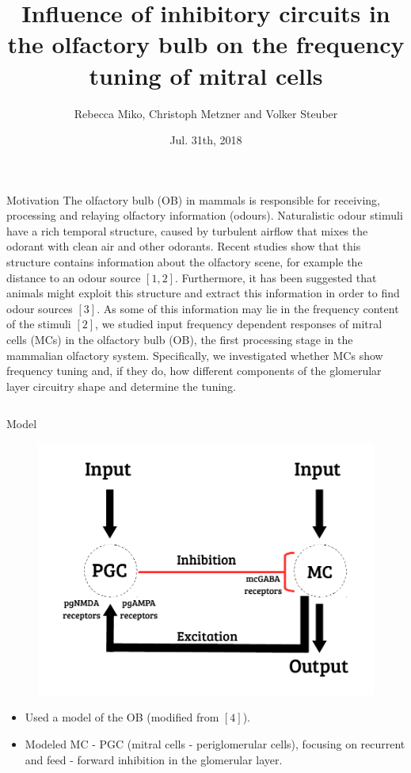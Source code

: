 \documentclass[final,hyperref={pdfpagelabels=false}]{beamer}
\title{Influence of inhibitory circuits in the olfactory bulb on the frequency tuning of mitral cells}
\author[Miko]{Rebecca Miko, Christoph Metzner and Volker Steuber}
\institute{University of Hertfordshire, AL10 9AB, UK}
\date{Jul. 31th, 2018}
\begin{document}
\begin{frame}{} 
\begin{block}{Motivation}
The olfactory bulb (OB) in mammals is responsible for receiving, processing and relaying olfactory information (odours). 
Naturalistic odour stimuli have a rich temporal structure, caused by turbulent airflow that mixes the odorant with clean air and other odorants. 
Recent studies show that this structure contains information about the olfactory scene, for example the distance to an odour source $[1,2]$. 
Furthermore, it has been suggested that animals might exploit this structure and extract this information in order to find odour sources $[3]$. 
As some of this information may lie in the frequency content of the stimuli $[2]$, we studied input frequency dependent responses of mitral cells (MCs) in the olfactory bulb (OB), the first processing stage in the mammalian olfactory system.
Specifically, we investigated whether MCs show frequency tuning and, if they do, how different components of the glomerular layer circuitry shape and determine the tuning.
\end{block}
    
    
\begin{columns}[t]
\begin{column}{.48\linewidth}
    
\begin{block}{Model} 
\begin{figure}
\center
\includegraphics[scale=0.6]{images/Circuit_Diagram}
\end{figure}
\begin{itemize}
\item Used a model of the OB (modified from $[4]$).
\item Modeled MC - PGC (mitral cells - periglomerular cells), focusing on recurrent and feed - forward inhibition in the glomerular layer.
\end{itemize}
\end{block}


\end{column}
\end{columns}
\end{frame}
\end{document}
